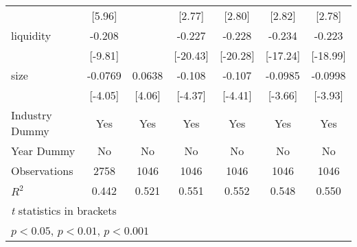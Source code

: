 {\begin{tabular}{l*{6}{c}}
            &      [5.96]         &                     &      [2.77]         &      [2.80]         &      [2.82]         &      [2.78]         \\
[1em]
liquidity   &      -0.208\sym{***}&                     &      -0.227\sym{***}&      -0.228\sym{***}&      -0.234\sym{***}&      -0.223\sym{***}\\
            &     [-9.81]         &                     &    [-20.43]         &    [-20.28]         &    [-17.24]         &    [-18.99]         \\
[1em]
size        &     -0.0769\sym{**} &      0.0638\sym{**} &      -0.108\sym{**} &      -0.107\sym{**} &     -0.0985\sym{*}  &     -0.0998\sym{*}  \\
            &     [-4.05]         &      [4.06]         &     [-4.37]         &     [-4.41]         &     [-3.66]         &     [-3.93]         \\
\hline
Industry Dummy&         Yes         &         Yes         &         Yes         &         Yes         &         Yes         &         Yes         \\
Year Dummy  &          No         &          No         &          No         &          No         &          No         &          No         \\
Observations&        2758         &        1046         &        1046         &        1046         &        1046         &        1046         \\
$ R^2 $     &       0.442         &       0.521         &       0.551         &       0.552         &       0.548         &       0.550         \\
\hline\hline
\multicolumn{7}{l}{\footnotesize \textit{t} statistics in brackets}\\
\multicolumn{7}{l}{\footnotesize \sym{*} \(p<0.05\), \sym{**} \(p<0.01\), \sym{***} \(p<0.001\)}\\
\end{tabular}
}
